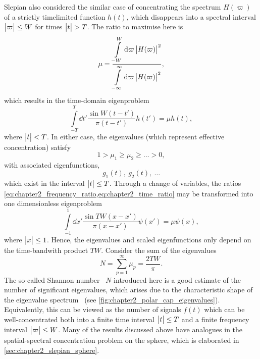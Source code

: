 Slepian \etal{} also considered the similar case of concentrating the spectrum \(H(\varpi)\) of a strictly timelimited function \(h(t)\), which disappears into a spectral interval \(\big\lvert\varpi\big\rvert \leq W\) for times \(\big\lvert t\big\rvert > T\).
The ratio to maximise here is
%
\begin{equation}\label{eq:chapter2_time_ratio}
	\mu
	= \frac{\displaystyle\int\limits_{-W}^{W} \dd{\varpi} \big\lvert H(\varpi)\big\rvert^{2}}
	{\displaystyle\int\limits_{-\infty}^{\infty} \dd{\varpi} \big\lvert H(\varpi)\big\rvert^{2}},
\end{equation}
%
which results in the time-domain eigenproblem
%
\begin{equation}\label{eq:chapter2_time_eigenproblem}
	\int\limits_{-T}^{T} \dd{t'} \frac{\sin{W(t-t')}}{\pi(t-t')} h(t')
	= \mu h(t),
\end{equation}
%
where \(\big\lvert t\big\rvert < T\).
In either case, the eigenvalues (which represent effective concentration) satisfy
%
\begin{equation}
	1 > \mu_{1} \geq \mu_{2} \geq \ldots > 0, %
\end{equation}
%
with associated eigenfunctions, \eg{}
%
\begin{equation}
	g_{1}(t),\ g_{2}(t),\ \ldots
\end{equation}
%
which exist in the interval \(\big\lvert t\big\rvert \leq T\).
Through a change of variables, the ratios \cref{eq:chapter2_frequency_ratio,eq:chapter2_time_ratio} may be transformed into one dimensionless eigenproblem
%
\begin{equation}
	\int\limits_{-1}^{1} \dd{x'} \frac{\sin{TW(x-x')}}{\pi(x-x')} \psi(x')
	= \mu \psi(x),
\end{equation}
%
where \(\big\lvert x\big\rvert \leq 1\).
Hence, the eigenvalues and scaled eigenfunctions only depend on the time-bandwith product \(TW\).
Consider the sum of the eigenvalues
%
\begin{equation}
	N
	= \sum\limits_{p=1}^{\infty} \mu_{p}
	= \frac{2TW}{\pi}.
\end{equation}
%
The so-called Shannon number~\cite{Percival1993} \(N\) introduced here is a good estimate of the number of significant eigenvalues, which arises due to the characteristic shape of the eigenvalue spectrum~\cite{Landau1965,Slepian1965} (see \cref{fig:chapter2_polar_cap_eigenvalues}).
Equivalently, this can be viewed as the number of signals \(f(t)\) which can be well-concentrated both into a finite time interval \(\big\lvert t\big\rvert \leq T\) and a finite frequency interval \(\big\lvert\varpi\big\rvert \leq W\).
Many of the results discussed above have analogues in the spatial-spectral concentration problem on the sphere, which is elaborated in \cref{sec:chapter2_slepian_sphere}.

